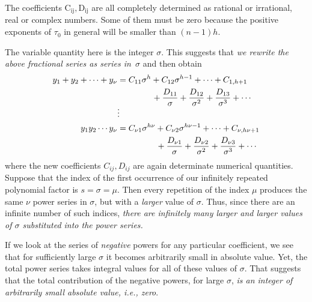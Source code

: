 \documentclass{article}
\theoremstyle{plain}
\theoremstyle{definition}
\begin{document}
The coefficients $\mathrm{C_{ij}},\mathrm{D_{ij}}$ are all completely
determined as
rational or irrational, real or complex 
numbers.  Some of
them must be zero because the positive exponents of $\tau_0$ in
general will be smaller than $(n - 1)h$.


The variable quantity here is the integer $\sigma$. This suggests that
\emph{we rewrite the above fractional series as series in~$\sigma$}
and then obtain
\begin{align*}
y_1 + y_2 +\cdots+ y_\nu
&= C_{11}\sigma^h + C_{12}\sigma^{h-1} +\cdots+ C_{1,h+1} 
\\
&\hspace*{4.1em}
+ \frac{D_{11}}{\sigma} + \frac{D_{12}}{\sigma^2} 
+ \frac{D_{13}}{\sigma^3} +\cdots
\\[-2\jot]
 & \vdots
\\
y_1y_2 \cdots y_\nu
&= C_{\nu1}\sigma^{h\nu} + C_{\nu2}\sigma^{h\nu -1} 
+\cdots+ C_{\nu,h\nu+1}
\\
&\hspace*{4.6em}
+ \frac{D_{\nu1}}{\sigma} 
+ \frac{D_{\nu2}}{\sigma^2} + \frac{D_{\nu3}}{\sigma^3} +\cdots
\end{align*}
where the new coefficients $C_{ij},D_{ij}$ are again determinate numerical
quantities. Suppose that the index of the first occurrence of our
infinitely repeated polynomial factor is $s = \sigma = \mu$. Then
every repetition of the index $\mu$ produces the same $\nu$ power
series in $\sigma$, but with a \emph{larger} value of $\sigma$. Thus,
since there are an infinite number of such indices, \emph{there are infinitely many larger and larger values of $\sigma$ substituted into the power series.
}


If we look at the series of \emph{negative} powers for any particular
coefficient, we see that for sufficiently large $\sigma$ it becomes
arbitrarily small in absolute value. Yet, the total power series takes
integral values for all of these values of $\sigma$. That suggests
that the total contribution of the negative powers, for large
$\sigma$, \emph{is an integer of arbitrarily small absolute value,
i.e., zero}.
\end{document}
